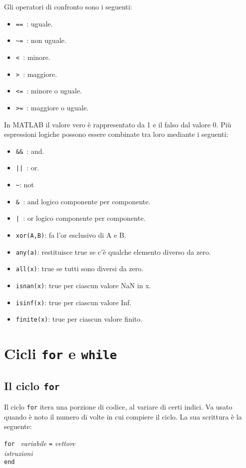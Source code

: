 Gli operatori di confronto sono i seguenti:
\begin{itemize}

	\item	\texttt{== }: uguale.
	\item	\texttt{\textasciitilde= }: non uguale.
	\item	\texttt{< }: minore.
	\item	\texttt{> }: maggiore.
	\item	\texttt{<= }: minore o uguale.
	\item 	\texttt{>= }: maggiore o uguale.

\end{itemize}

In MATLAB il valore vero è rappresentato da 1 e il falso dal valore 0.
Più espressioni logiche possono essere combinate tra loro mediante i seguenti:
\begin{itemize}

	\item	\texttt{\&\& }: and.
	\item	\texttt{|| }: or.
	\item	\texttt{\textasciitilde }: not
	\item	\texttt{\& }: and logico componente per componente.
	\item	\texttt{| }: or logico componente per componente.
    \item	\texttt{xor(A,B)}: fa l'or esclusivo di A e B.
    \item	\texttt{any(a)}: restituisce true se c'è qualche elemento diverso da zero.
    \item	\texttt{all(x)}: true se tutti sono diversi da zero. 
    \item	\texttt{isnan(x)}: true per ciascun valore NaN in x.
    \item	\texttt{isinf(x)}: true per ciascun valore Inf.
    \item	\texttt{finite(x)}: true per ciascun valore finito.

\end{itemize}


\section{Cicli \texttt{for} e \texttt{while}}
\subsection{Il ciclo \texttt{for}}
Il ciclo \texttt{for} itera una porzione di codice, al variare di certi indici. Va usato quando è noto il numero di 
volte in cui compiere il ciclo. La sua scrittura è la seguente:
\begin{center}
\texttt{for } \textit{variabile} \texttt{=} \textit{vettore} \\ 
\hspace{1.5cm}\textit{istruzioni}  \\
\hspace{-3.5cm}\texttt{end}
\end{center}

